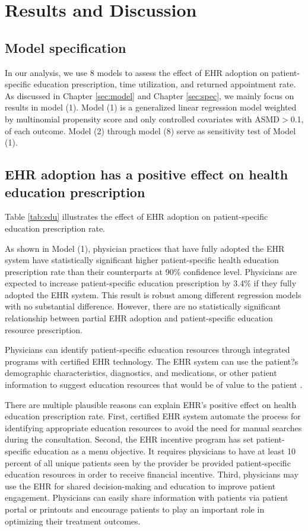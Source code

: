 \documentclass[12pt]{report}
\begin{document}
\chapter{Results and Discussion}
\section{Model specification}
In our analysis, we use 8 models to assess the effect of EHR adoption on patient-specific education prescription, time utilization, and returned appointment rate. As discussed in Chapter \ref{sec:model} and Chapter \ref{sec:spec}, we mainly focus on results in model (1). Model (1) is a generalized linear regression model weighted by multinomial propensity score and only controlled covariates with ASMD$>$0.1, of each outcome. Model (2) through model (8) serve as sensitivity test of Model (1). 

\section{EHR adoption has a positive effect on health education prescription}
Table \ref{tab:edu} illustrates the effect of EHR adoption on patient-specific education prescription rate. 

As shown in Model (1), physician practices that have fully adopted the EHR system have statistically significant higher patient-specific health education prescription rate than their counterparts at 90\% confidence level. Physicians are expected to increase patient-specific education prescription by 3.4\% if they fully adopted the EHR system. This result is robust among different regression models with no substantial difference. However, there are no statistically significant relationship between partial EHR adoption and patient-specific education resource prescription. 

Physicians can identify patient-specific education resources through integrated programs with certified EHR technology. The EHR system can use the patient?s demographic characteristics, diagnostics, and medications, or other patient information to suggest education resources that would be of value to the patient \citep{hitrc_edu}. 

There are multiple plausible reasons can explain EHR's positive effect on health education prescription rate. First, certified EHR system automate the process for identifying appropriate education resources to avoid the need for manual searches during the consultation. Second, the EHR incentive program has set patient-specific education as a menu objective. It requires physicians to have at least 10 percent of all unique patients seen by the provider be provided patient-specific education resources in order to receive financial incentive. Third, physicians may use the EHR for shared decision-making and education to improve patient engagement. Physicians can easily share information with patients via patient portal or printouts and encourage patients to play an important role in optimizing their treatment outcomes.
\end{document}
